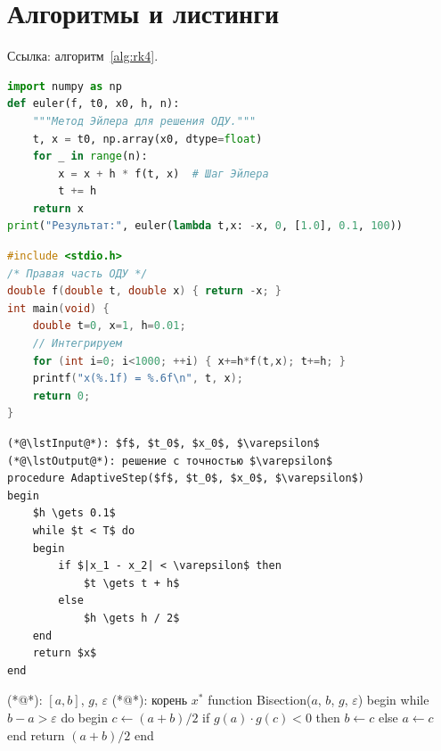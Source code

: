 \documentclass[font=modern]{cmcmsuthesis-cw}
\begin{document}
\section{Алгоритмы и листинги}

\begin{algorithm}[H]
\caption{Метод Рунге--Кутты}\label{alg:rk4}
\;
\end{algorithm}

Ссылка: алгоритм~\ref{alg:rk4}.

\begin{lstlisting}[language=Python,caption={Python},label={lst:py}]
import numpy as np
def euler(f, t0, x0, h, n):
    """Метод Эйлера для решения ОДУ."""
    t, x = t0, np.array(x0, dtype=float)
    for _ in range(n):
        x = x + h * f(t, x)  # Шаг Эйлера
        t += h
    return x
print("Результат:", euler(lambda t,x: -x, 0, [1.0], 0.1, 100))
\end{lstlisting}

\begin{lstlisting}[language=C,caption={C},label={lst:c}]
#include <stdio.h>
/* Правая часть ОДУ */
double f(double t, double x) { return -x; }
int main(void) {
    double t=0, x=1, h=0.01;
    // Интегрируем
    for (int i=0; i<1000; ++i) { x+=h*f(t,x); t+=h; }
    printf("x(%.1f) = %.6f\n", t, x);
    return 0;
}
\end{lstlisting}

\begin{lstlisting}[style=pseudocode,caption={Псевдокод}]
(*@\lstInput@*): $f$, $t_0$, $x_0$, $\varepsilon$
(*@\lstOutput@*): решение с точностью $\varepsilon$
procedure AdaptiveStep($f$, $t_0$, $x_0$, $\varepsilon$)
begin
    $h \gets 0.1$
    while $t < T$ do
    begin
        if $|x_1 - x_2| < \varepsilon$ then
            $t \gets t + h$
        else
            $h \gets h / 2$
    end
    return $x$
end
\end{lstlisting}

\begin{lstpseudocode}[caption={Бисекция},label={alg:bisect}]
(*@\lstInput@*): $[a,b]$, $g$, $\varepsilon$
(*@\lstOutput@*): корень $x^*$
function Bisection($a$, $b$, $g$, $\varepsilon$)
begin
    while $b - a > \varepsilon$ do
    begin
        $c \gets (a+b)/2$
        if $g(a)\cdot g(c)<0$ then $b\gets c$
        else $a\gets c$
    end
    return $(a+b)/2$
end
\end{lstpseudocode}
\end{document}
